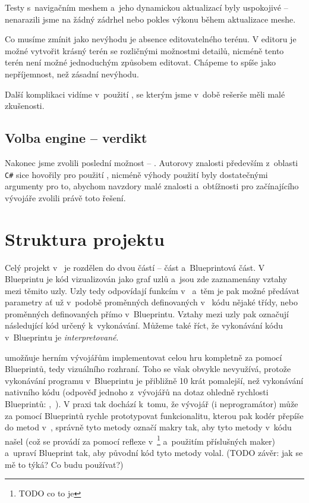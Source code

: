 Testy s~navigačním meshem a~jeho dynamickou aktualizací byly uspokojivé -- nenarazili jsme na žádný zádrhel nebo pokles výkonu během aktualizace meshe. 

Co musíme zmínit jako nevýhodu je absence editovatelného terénu. V editoru je možné vytvořit krásný terén se rozličnými možnostmi detailů, nicméně tento terén není možné jednoduchým způsobem editovat. Chápeme to spíše jako nepříjemnost, než zásadní nevýhodu. 

Další komplikaci vidíme v~použití \CPP{}, se kterým jsme v~době rešerše měli malé zkušenosti.




\subsection{Volba engine -- verdikt}


Nakonec jsme zvolili poslední možnost -- \UE{}. Autorovy znalosti především z~oblasti \texttt{C\#} sice hovořily pro použití \UN{}, nicméně výhody použití \UE{} byly dostatečnými argumenty pro to, abychom navzdory malé znalosti \CPP{} a~obtížnosti pro začínajícího vývojáře zvolili právě toto řešení.

\section{Struktura projektu}

Celý projekt v~\UE{} je rozdělen do dvou částí -- \CPP{} část a~Blueprintová část. V Blueprintu je kód vizualizován jako graf uzlů a~jsou zde zaznamenány vztahy mezi těmito uzly. Uzly tedy odpovídají funkcím v~\CPP{} a~těm je pak možné předávat parametry ať už v~podobě proměnných definovaných v~\CPP{} kódu nějaké třídy, nebo proměnných definovaných přímo v~Blueprintu. Vztahy mezi uzly pak označují následující kód určený k~vykonávání. Můžeme také říct, že vykonávání kódu v~Blueprintu je \textit{interpretované}.

 \UE{} umožňuje herním vývojářům implementovat celou hru kompletně za pomocí Blueprintů, tedy vizuálního rozhraní. Toho se však obvykle nevyužívá, protože vykonávání programu v~Blueprintu je přibližně 10 krát pomalejší, než vykonávání nativního \CPP{} kódu (odpověď jednoho z~vývojářů \UE{} na dotaz ohledně rychlosti Blueprintů: ,~\citep{ue_performance}). V praxi tak dochází k~tomu, že vývojář (i neprogramátor) může za pomocí Blueprintů rychle prototypovat funkcionalitu, kterou pak kodér přepíše do metod v~\CPP{}, správně tyto metody označí makry tak, aby \UE{} tyto metody v~kódu našel (což se provádí za pomocí reflexe v~\UBT{}\footnote{TODO co to je} a~použitím příslušných \CPP{} maker) a~upraví Blueprint tak, aby původní kód tyto metody volal. (TODO závěr: jak se mě to týká? Co budu používat?)

